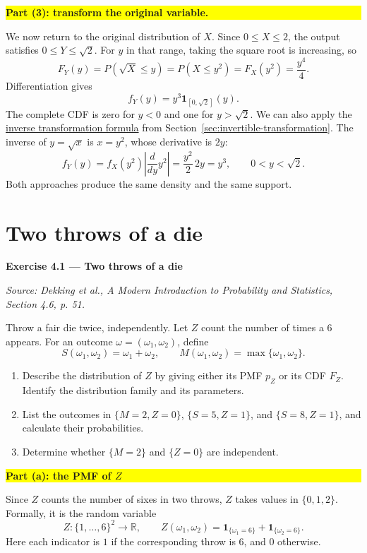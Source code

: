 \documentclass[a4paper,12pt,oneside]{report}
\newcommand{\solutionheading}[1]{%
  \par\Needspace{5\baselineskip}\noindent
  \begingroup\setlength{\fboxsep}{1pt}%
  \colorbox{yellow}{\strut\textbf{#1}}\endgroup\par\nobreak}
\begin{document}
\solutionheading{Part (3): transform the original variable.}
We now return to the original distribution of $X$. Since
$0\leq X\leq2$, the output satisfies $0\leq Y\leq\sqrt2$.
For $y$ in that range, taking the square root is increasing, so
\[
  F_Y(y)=P(\sqrt X\leq y)=P(X\leq y^2)
        =F_X(y^2)=\frac{y^4}{4}.
\]
Differentiation gives
\[
  \boxed{f_Y(y)=y^3\mathbf1_{[0,\sqrt2]}(y).}
\]
The complete CDF is zero for $y<0$ and one for $y>\sqrt2$.
We can also apply the \hyperref[sec:invertible-transformation]
{inverse transformation formula} from Section~\ref{sec:invertible-transformation}.
The inverse of $y=\sqrt x$ is $x=y^2$, whose derivative is $2y$:
\[
  f_Y(y)=f_X(y^2)\left|\frac{d}{dy}y^2\right|
         =\frac{y^2}{2}\,2y=y^3,
  \qquad 0<y<\sqrt2.
\]
Both approaches produce the same density and the same support.

\clearpage
\section{Two throws of a die}
\begin{tcolorbox}[colback=white,colframe=black!45,boxrule=0.5pt,arc=2mm]
\textbf{Exercise 4.1 --- Two throws of a die}\par\smallskip
\textit{Source: Dekking et al., A Modern Introduction to Probability
and Statistics, Section 4.6, p. 51.}

Throw a fair die twice, independently. Let $Z$ count the number of
times a $6$ appears. For an outcome $\omega=(\omega_1,\omega_2)$,
define
\[
  S(\omega_1,\omega_2)=\omega_1+\omega_2,
  \qquad M(\omega_1,\omega_2)=\max\{\omega_1,\omega_2\}.
\]
\begin{enumerate}[label=(\alph*)]
  \item Describe the distribution of $Z$ by giving either its PMF
    $p_Z$ or its CDF $F_Z$. Identify the distribution family and its
    parameters.
  \item List the outcomes in $\{M=2,Z=0\}$, $\{S=5,Z=1\}$, and
    $\{S=8,Z=1\}$, and calculate their probabilities.
  \item Determine whether $\{M=2\}$ and $\{Z=0\}$ are independent.
\end{enumerate}
\end{tcolorbox}

\solutionheading{Part (a): the PMF of $Z$}
Since $Z$ counts the number of sixes in two throws, $Z$ takes values
in $\{0,1,2\}$. Formally, it is the random variable
\[
  Z:\{1,\ldots,6\}^2\longrightarrow\mathbb R,
  \qquad
  Z(\omega_1,\omega_2)
  =\mathbf 1_{\{\omega_1=6\}}+\mathbf 1_{\{\omega_2=6\}}.
\]
Here each indicator is $1$ if the corresponding throw is $6$, and
$0$ otherwise.
\end{document}
